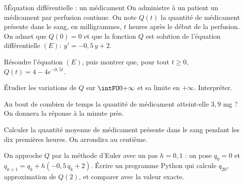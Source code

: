 \begin{exoBac}{5}{Équation différentielle : un médicament}
On administre à un patient un médicament par perfusion continue. On note $Q(t)$ la quantité de médicament présente dans le sang, en
milligrammes, $t$ heures après le début de la perfusion. On admet que $Q(0)=0$ et que la fonction $Q$ est solution de l'équation
différentielle $(E):\ y'=-0{,}5\,y+2$.
\begin{questions}
  \item Résoudre l'équation $(E)$, puis montrer que, pour tout $t\geq0$, $Q(t)=4-4e^{-0{,}5t}$.
  \item Étudier les variations de $Q$ sur $\intFO0{+\infty}$ et sa limite en $+\infty$. Interpréter.
  \item Au bout de combien de temps la quantité de médicament atteint-elle $3{,}9$ mg ? On donnera la réponse à la minute près.
  \item Calculer la quantité moyenne de médicament présente dans le sang pendant les dix premières heures. On arrondira au centième.
  \item On approche $Q$ par la méthode d'Euler avec un pas $h=0{,}1$ : on pose $q_0=0$ et
    $q_{k+1}=q_k+h\left(-0{,}5\,q_k+2\right)$. Écrire un programme Python qui calcule $q_{20}$, approximation de $Q(2)$, et comparer avec la
    valeur exacte.
\end{questions}
\end{exoBac}

